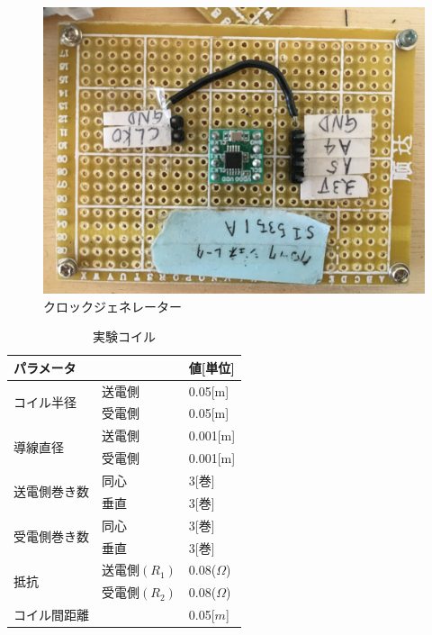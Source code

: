 \documentclass[12pt]{jarticle}
\begin{document}
 \begin{figure}[H]
	\centering
	\includegraphics[scale=0.1,angle=180]{IMG_0737.JPG}
	\caption{クロックジェネレーター}
	\label{fig:clk}
\end{figure}
\begin{table}[h]
	\caption{実験コイル}
	\centering
	\label{tab:koiru}
	\begin{tabular}{|l|l|l|}
		\hline
		\multicolumn{2}{|l|}{パラメータ}          & 値{[}単位{]}                 \\ \hline
		\multirow{2}{*}{コイル半径}  & 送電側        & 0.05{[}m{]}               \\ \cline{2-3} 
		& 受電側        & 0.05{[}m{]}               \\ \hline
		\multirow{2}{*}{導線直径}   & 送電側        & 0.001{[}m{]}              \\ \cline{2-3} 
		& 受電側        & 0.001{[}m{]}              \\ \hline
		\multirow{2}{*}{送電側巻き数} & 同心         & 3{[}巻{]}                  \\ \cline{2-3} 
		& 垂直         & 3{[}巻{]}                  \\ \hline
		\multirow{2}{*}{受電側巻き数} & 同心         & 3{[}巻{]}                  \\ \cline{2-3} 
		& 垂直         & 3{[}巻{]}                  \\ \hline
		\multirow{2}{*}{抵抗}     & 送電側$(R_1)$ & 0.08($\Omega$) \\ \cline{2-3} 
		& 受電側$(R_2)$ & 0.08($\Omega$) \\ \hline
		\multicolumn{2}{|l|}{コイル間距離}      & 0.05{[}$m${]}                   \\ \hline
	\end{tabular}
\end{table}
\end{document}
